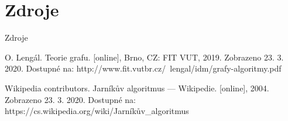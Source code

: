 \documentclass[pdf]{beamer}
\begin{document}
\section{Zdroje}
\begin{frame}{Zdroje}
    \begin{thebibliography}{99}
    
         O. Lengál. Teorie grafu. [online], Brno, CZ: FIT VUT, 2019. Zobrazeno 23. 3. 2020. Dostupné na: http://www.fit.vutbr.cz/~lengal/idm/grafy-algoritmy.pdf

          Wikipedia contributors. Jarníkův algoritmus --- Wikipedie. [online], 2004. Zobrazeno 23. 3. 2020. Dostupné na: https://cs.wikipedia.org/wiki/Jarníkův\_algoritmus
        
    \end{thebibliography}
\end{frame}

    
\end{document}
